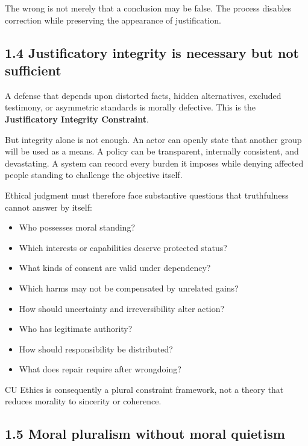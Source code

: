 \documentclass[
  11pt,
]{article}
\providecommand{\tightlist}{%
  \setlength{\itemsep}{0pt}\setlength{\parskip}{0pt}}
\begin{document}
The wrong is not merely that a conclusion may be false. The process
disables correction while preserving the appearance of justification.

\subsection{1.4 Justificatory integrity is necessary but not
sufficient}\label{justificatory-integrity-is-necessary-but-not-sufficient}

A defense that depends upon distorted facts, hidden alternatives,
excluded testimony, or asymmetric standards is morally defective. This
is the \textbf{Justificatory Integrity Constraint}.

But integrity alone is not enough. An actor can openly state that
another group will be used as a means. A policy can be transparent,
internally consistent, and devastating. A system can record every burden
it imposes while denying affected people standing to challenge the
objective itself.

Ethical judgment must therefore face substantive questions that
truthfulness cannot answer by itself:

\begin{itemize}
\tightlist
\item
  Who possesses moral standing?
\item
  Which interests or capabilities deserve protected status?
\item
  What kinds of consent are valid under dependency?
\item
  Which harms may not be compensated by unrelated gains?
\item
  How should uncertainty and irreversibility alter action?
\item
  Who has legitimate authority?
\item
  How should responsibility be distributed?
\item
  What does repair require after wrongdoing?
\end{itemize}

CU Ethics is consequently a plural constraint framework, not a theory
that reduces morality to sincerity or coherence.

\subsection{1.5 Moral pluralism without moral
quietism}\label{moral-pluralism-without-moral-quietism}
\end{document}
